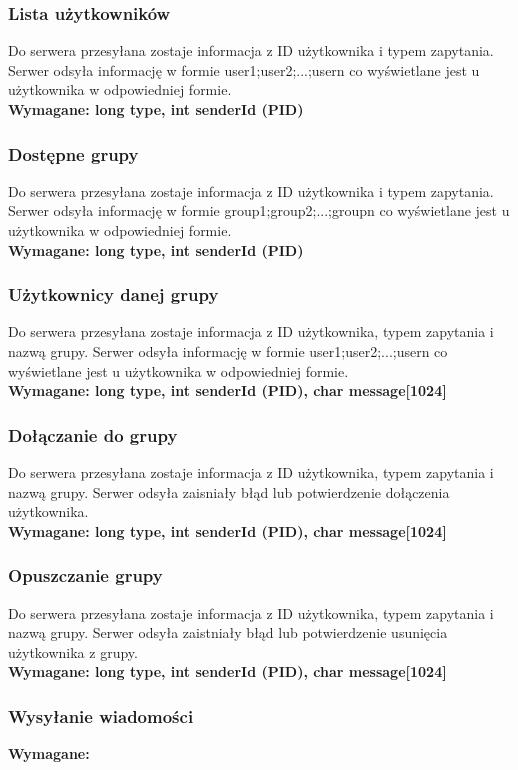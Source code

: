\documentclass[11pt]{article}
\begin{document}
	\subsubsection{Lista użytkowników}
	Do serwera przesyłana zostaje informacja z ID użytkownika i typem zapytania. Serwer odsyła informację w formie user1;user2;...;usern co wyświetlane jest u użytkownika w odpowiedniej formie.\\
	\textbf{Wymagane: long type, int senderId (PID)}
	\subsubsection{Dostępne grupy}
	Do serwera przesyłana zostaje informacja z ID użytkownika i typem zapytania. Serwer odsyła informację w formie group1;group2;...;groupn co wyświetlane jest u użytkownika w odpowiedniej formie.\\
	\textbf{Wymagane: long type, int senderId (PID)}
	\subsubsection{Użytkownicy danej grupy}
	Do serwera przesyłana zostaje informacja z ID użytkownika, typem zapytania i nazwą grupy. Serwer odsyła informację w formie user1;user2;...;usern co wyświetlane jest u użytkownika w odpowiedniej formie.\\
	\textbf{Wymagane: long type, int senderId (PID), char message[1024]}
	\subsubsection{Dołączanie do grupy}
	Do serwera przesyłana zostaje informacja z ID użytkownika, typem zapytania i nazwą grupy. Serwer odsyła zaisniały błąd lub potwierdzenie dołączenia użytkownika.\\
	\textbf{Wymagane: long type, int senderId (PID), char message[1024]}
	\subsubsection{Opuszczanie grupy}
	Do serwera przesyłana zostaje informacja z ID użytkownika, typem zapytania i nazwą grupy. Serwer odsyła zaistniały błąd lub potwierdzenie usunięcia użytkownika z grupy.\\
	\textbf{Wymagane: long type, int senderId (PID), char message[1024]}
	\subsubsection{Wysyłanie wiadomości}
	\textbf{Wymagane:}
\end{document}
